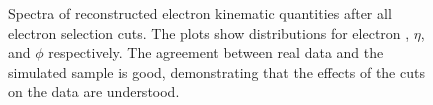  \begin{figure}[htb]
  \begin{center}
  \end{center}
   \caption[Reconstructed electron \pt, $\eta$, $\phi$ spectra after full selection]{
   Spectra of reconstructed electron kinematic quantities after all electron selection cuts. 
   The plots show distributions for electron \pt, $\eta$, and $\phi$ respectively.  
   The agreement between real data and the simulated sample is good, demonstrating 
   that the effects of the cuts on the data are understood.  
  }
  \label{fig:RecoSpectraAfterEid}
 \end{figure}


